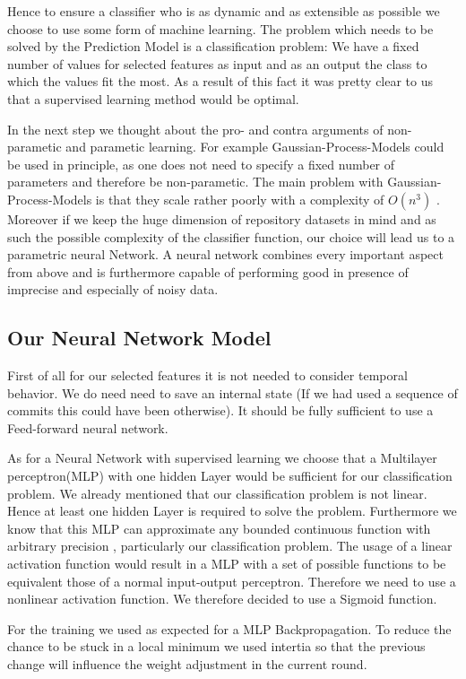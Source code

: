 \documentclass[paper=A4,pagesize=auto,12pt,headinclude=true,footinclude=true,BCOR=0mm,DIV=calc]{scrartcl}
\begin{document}
	Hence to ensure a classifier who is as dynamic and as extensible as possible we choose to use some form of machine learning.
	The problem which needs to be solved by the Prediction Model is a classification problem: We have a fixed number of values for selected features as input and as an output the class to which the values fit the most. As a result of this fact it was pretty clear to us that a supervised learning method would be optimal.
	
	In the next step we thought about the pro- and contra arguments of non-parametic and parametic learning.
	For example Gaussian-Process-Models could be used in principle, as one does not need to specify a fixed number of parameters and therefore be non-parametic. 
	The main problem with Gaussian-Process-Models is that they scale rather poorly with a complexity of $O(n^{3})$ \cite{DukeUniversity}. Moreover if we keep the huge dimension of repository datasets in mind and as such the possible complexity of the classifier function, our choice will lead us to a parametric neural Network. A neural network combines every important aspect from above and is furthermore capable of performing good in presence of imprecise and especially of noisy data.
	
	\subsection{Our Neural Network Model}
First of all for our selected features it is not needed to consider temporal behavior. We do need need to save an internal state (If we had used a sequence of commits this could have been otherwise). It should be fully sufficient to use a Feed-forward neural network.

As for a Neural Network with supervised learning we choose that a Multilayer perceptron(MLP) with one hidden Layer would be sufficient for our classification problem. We already mentioned that our classification problem is not linear. Hence at least one hidden Layer is required to solve the problem. Furthermore we know that this MLP can approximate any bounded continuous function with arbitrary precision \cite{ApproximateAnyFunction}, particularly our classification problem.
The usage of a linear activation function would result in a MLP with a set of possible functions to be equivalent those of a normal input-output perceptron. Therefore we need to use a nonlinear activation function. We therefore decided to use a Sigmoid function. 

For the training we used as expected for a MLP Backpropagation. To reduce the chance to be stuck in a local minimum we used intertia so that the previous change will influence the weight adjustment in the current round.
\end{document}
